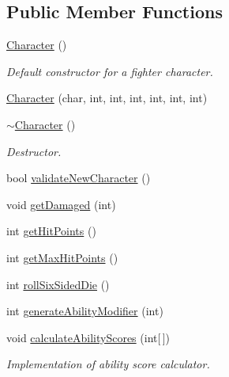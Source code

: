 \subsection*{Public Member Functions}
\begin{DoxyCompactItemize}
\item 
\hypertarget{class_character_adc27bdd255876169bad2ed0bae0cffb5}{}\label{class_character_adc27bdd255876169bad2ed0bae0cffb5} 
\hyperlink{class_character_adc27bdd255876169bad2ed0bae0cffb5}{Character} ()
\begin{DoxyCompactList}\small\item\em Default constructor for a fighter character. \end{DoxyCompactList}\item 
\hyperlink{class_character_aad0274b7a8cbb4fa8e0dddd0622d8870}{Character} (char, int, int, int, int, int, int)
\item 
\hypertarget{class_character_a9e9be564d05ded80962b2045aa70b3fc}{}\label{class_character_a9e9be564d05ded80962b2045aa70b3fc} 
\hyperlink{class_character_a9e9be564d05ded80962b2045aa70b3fc}{$\sim$\+Character} ()
\begin{DoxyCompactList}\small\item\em Destructor. \end{DoxyCompactList}\item 
bool \hyperlink{class_character_adae2bb0e0bb6b8d010be6d1ac3b1fd5f}{validate\+New\+Character} ()
\item 
void \hyperlink{class_character_a43566a6c7af77bde11b8f4c5e86c936f}{get\+Damaged} (int)
\item 
int \hyperlink{class_character_ac28870a30c9b451f55c3e27adaabfbfa}{get\+Hit\+Points} ()
\item 
int \hyperlink{class_character_a2c14caedf6a4a354589c14c7a2f53b0e}{get\+Max\+Hit\+Points} ()
\item 
int \hyperlink{class_character_a9710bee1a9f7c1e474abff5dd55adc8d}{roll\+Six\+Sided\+Die} ()
\item 
int \hyperlink{class_character_af3700e847620a19ada153eb10e600c22}{generate\+Ability\+Modifier} (int)
\item 
\hypertarget{class_character_a11166d1faa3af99548fa9e8dc2979eaf}{}\label{class_character_a11166d1faa3af99548fa9e8dc2979eaf} 
void \hyperlink{class_character_a11166d1faa3af99548fa9e8dc2979eaf}{calculate\+Ability\+Scores} (int\mbox{[}$\,$\mbox{]})
\begin{DoxyCompactList}\small\item\em Implementation of ability score calculator. \end{DoxyCompactList}\item 

\end{DoxyCompactItemize}
